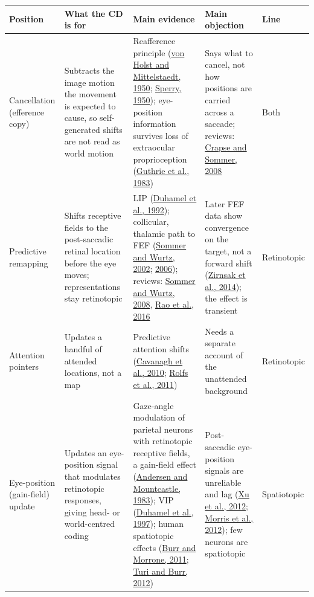 \documentclass[11pt,a4paper]{article}
\begin{document}
{\footnotesize\setlength{\tabcolsep}{3pt}
\begin{longtable}{>{\raggedright\arraybackslash}p{2.12cm}>{\raggedright\arraybackslash}p{3.13cm}>{\raggedright\arraybackslash}p{4.51cm}>{\raggedright\arraybackslash}p{3.31cm}>{\raggedright\arraybackslash}p{1.47cm}}
\toprule
\textbf{Position} & \textbf{What the CD is for} & \textbf{Main evidence} & \textbf{Main objection} & \textbf{Line} \\
\midrule
\endhead
Cancellation (efference copy) & Subtracts the image motion the movement is expected to cause, so self-generated shifts are not read as world motion & Reafference principle (\href{https://doi.org/10.1007/BF00622503}{von Holst and Mittelstaedt, 1950}; \href{https://doi.org/10.1037/h0055479}{Sperry, 1950}); eye-position information survives loss of extraocular proprioception (\href{https://www.jstor.org/stable/1690996}{Guthrie et al., 1983}) & Says what to cancel, not how positions are carried across a saccade; reviews: \href{https://doi.org/10.1038/nrn2457}{Crapse and Sommer, 2008} & Both \\
\addlinespace[2pt]
Predictive remapping & Shifts receptive fields to the post-saccadic retinal location before the eye moves; representations stay retinotopic & LIP (\href{https://www.science.org/doi/10.1126/science.1553535}{Duhamel et al., 1992}); collicular, thalamic path to FEF (\href{https://doi.org/10.1126/science.1069590}{Sommer and Wurtz, 2002}; \href{https://www.nature.com/articles/nature05279}{2006}); reviews: \href{https://doi.org/10.1146/annurev.neuro.31.060407.125627}{Sommer and Wurtz, 2008}, \href{https://doi.org/10.1152/jn.00182.2016}{Rao et al., 2016} & Later FEF data show convergence on the target, not a forward shift (\href{https://doi.org/10.1038/nature13149}{Zirnsak et al., 2014}); the effect is transient & Retinotopic \\
\addlinespace[2pt]
Attention pointers & Updates a handful of attended locations, not a map & Predictive attention shifts (\href{https://doi.org/10.1016/j.tics.2010.01.007}{Cavanagh et al., 2010}; \href{https://doi.org/10.1038/nn.2711}{Rolfs et al., 2011}) & Needs a separate account of the unattended background & Retinotopic \\
\addlinespace[2pt]
Eye-position (gain-field) update & Updates an eye-position signal that modulates retinotopic responses, giving head- or world-centred coding & Gaze-angle modulation of parietal neurons with retinotopic receptive fields, a gain-field effect (\href{https://doi.org/10.1523/JNEUROSCI.03-03-00532.1983}{Andersen and Mountcastle, 1983}); VIP (\href{https://www.nature.com/articles/39865}{Duhamel et al., 1997}); human spatiotopic effects (\href{https://doi.org/10.1098/rstb.2010.0244}{Burr and Morrone, 2011}; \href{https://royalsocietypublishing.org/doi/10.1098/rspb.2012.0637}{Turi and Burr, 2012}) & Post-saccadic eye-position signals are unreliable and lag (\href{https://doi.org/10.1016/j.neuron.2012.10.034}{Xu et al., 2012}; \href{https://doi.org/10.1016/j.cub.2011.12.032}{Morris et al., 2012}); few neurons are spatiotopic & Spatiotopic \\

\end{longtable}}
\end{document}
